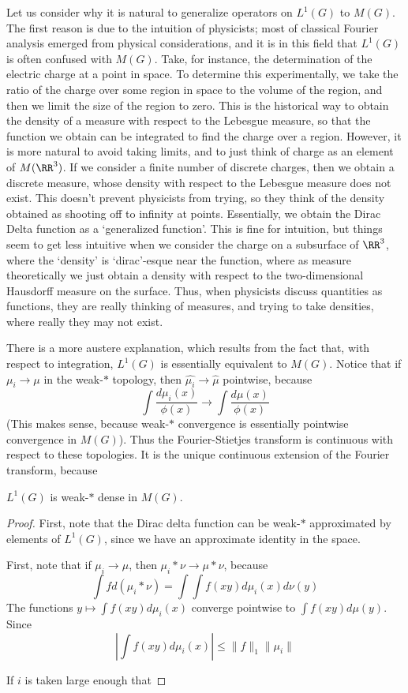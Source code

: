 Let us consider why it is natural to generalize operators on $L^1(G)$ to $M(G)$. The first reason is due to the intuition of physicists; most of classical Fourier analysis emerged from physical considerations, and it is in this field that $L^1(G)$ is often confused with $M(G)$. Take, for instance, the determination of the electric charge at a point in space. To determine this experimentally, we take the ratio of the charge over some region in space to the volume of the region, and then we limit the size of the region to zero. This is the historical way to obtain the density of a measure with respect to the Lebesgue measure, so that the function we obtain can be integrated to find the charge over a region. However, it is more natural to avoid taking limits, and to just think of charge as an element of $M(\RR^3)$. If we consider a finite number of discrete charges, then we obtain a discrete measure, whose density with respect to the Lebesgue measure does not exist. This doesn't prevent physicists from trying, so they think of the density obtained as shooting off to infinity at points. Essentially, we obtain the Dirac Delta function as a `generalized function'. This is fine for intuition, but things seem to get less intuitive when we consider the charge on a subsurface of $\RR^3$, where the `density' is `dirac'-esque near the function, where as measure theoretically we just obtain a density with respect to the two-dimensional Hausdorff measure on the surface. Thus, when physicists discuss quantities as functions, they are really thinking of measures, and trying to take densities, where really they may not exist.

There is a more austere explanation, which results from the fact that, with respect to integration, $L^1(G)$ is essentially equivalent to $M(G)$. Notice that if $\mu_i \to \mu$ in the weak-$*$ topology, then $\widehat{\mu_i} \to \widehat{\mu}$ pointwise, because
%
\[ \int \frac{d\mu_i(x)}{\phi(x)} \to \int \frac{d\mu(x)}{\phi(x)} \]
%
(This makes sense, because weak-$*$ convergence is essentially pointwise convergence in $M(G)$). Thus the Fourier-Stietjes transform is continuous with respect to these topologies. It is the unique continuous extension of the Fourier transform, because

\begin{theorem}
    $L^1(G)$ is weak-$*$ dense in $M(G)$.
\end{theorem}
\begin{proof}
    First, note that the Dirac delta function can be weak-$*$ approximated by elements of $L^1(G)$, since we have an approximate identity in the space.

    First, note that if $\mu_i \to \mu$, then $\mu_i * \nu \to \mu * \nu$, because
    \[ \int f d(\mu_i * \nu) = \int \int f(xy) d\mu_i(x) d\nu(y) \]
    The functions $y \mapsto \int f(xy) d\mu_i(x)$ converge pointwise to $\int f(xy) d\mu(y)$. Since
    \[ \left| \int f(xy) d\mu_i(x) \right| \leq \| f \|_1 \| \mu_i \| \]

    If $i$ is taken large enough that
\end{proof}

